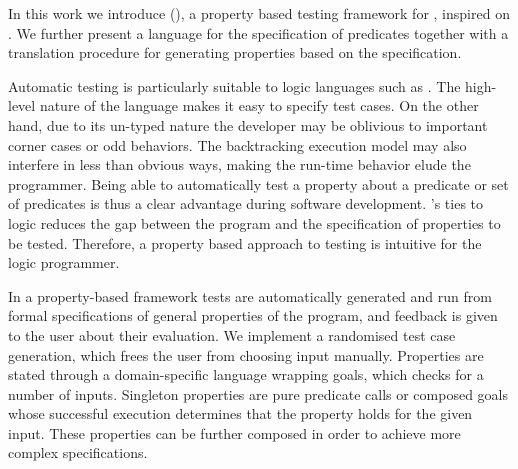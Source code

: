 In this work we introduce \plqc{} (\Prolog\QuickCheck), a
property based testing framework for \Prolog{}, inspired on
 \QuickCheck \cite{quickcheck}.
%
We further present a language for the specification of \Prolog{} predicates
together with a translation procedure for generating \plqc{} properties
based on the specification.


Automatic testing is particularly suitable to logic languages such as
\Prolog{}. The high-level nature of the language makes it easy to
specify test cases.
%
On the other hand, due to its un-typed nature the developer may be
oblivious to important corner cases or odd behaviors.
%
The backtracking execution model may also interfere in less than obvious
ways, making the run-time behavior elude the programmer.
%
Being able to automatically test a property about a predicate or set of
predicates is thus a clear advantage during software development.
%
\Prolog{}'s ties to logic reduces the gap between the program and the
specification of properties to be tested.
%
Therefore, a property based approach to testing is intuitive for the
logic programmer.  


In a property-based framework tests are automatically generated and run from formal specifications of general
properties of the program, and feedback is given to the user about their
evaluation.
%
We implement a randomised test case generation, which frees the user
from choosing input manually.
%
Properties are stated through a domain-specific language wrapping
\Prolog{} goals, which \plqc{} checks for a number of inputs.
%
Singleton properties are pure predicate calls
or composed goals whose successful execution determines that the
property holds for the given input.
%
These properties can be further composed in order to achieve more complex
specifications.




